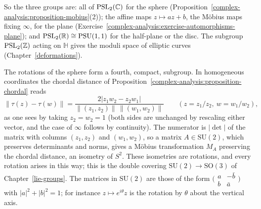 So the three groups are: all of $\mathrm{PSL}_2(\mathbb{C})$ for the sphere (Proposition~\ref{complex-analysis:proposition-mobius}(2)); the affine maps $z \mapsto az + b$, the M\"obius maps fixing $\infty$, for the plane
(Exercise~\ref{complex-analysis:exercise-automorphisms-plane}); and $\mathrm{PSL}_2(\mathbb{R}) \cong \mathrm{PSU}(1, 1)$ for the half-plane or the disc. The subgroup $\mathrm{PSL}_2(\mathbb{Z})$ acting on $\mathbb{H}$ gives the moduli
space of elliptic curves (Chapter~\ref{deformations}).

The rotations of the sphere form a fourth, compact, subgroup. In homogeneous coordinates the chordal distance of Proposition~\ref{complex-analysis:proposition-chordal} reads
\[
\|\tau(z) - \tau(w)\| = \frac{2|z_1w_2 - z_2w_1|}{\|(z_1, z_2)\|\,\|(w_1, w_2)\|} \qquad (z = z_1/z_2, \ w = w_1/w_2),
\]
as one sees by taking $z_2 = w_2 = 1$ (both sides are unchanged by rescaling either vector, and the case of $\infty$ follows by continuity). The numerator is $|\det|$ of the matrix with columns $(z_1, z_2)$ and
$(w_1, w_2)$, so a matrix $A \in \mathrm{SU}(2)$, which preserves determinants and norms, gives a M\"obius transformation $M_A$ preserving the chordal distance, an isometry of $S^2$. These isometries are rotations, and
every rotation arises in this way; this is the double covering $\mathrm{SU}(2) \to \mathrm{SO}(3)$ of Chapter~\ref{lie-groups}. The matrices in $\mathrm{SU}(2)$ are those of the form
$\bigl(\begin{smallmatrix}a & -\bar b\\ b & \bar a\end{smallmatrix}\bigr)$ with $|a|^2 + |b|^2 = 1$; for instance $z \mapsto e^{i\theta}z$ is the rotation by $\theta$ about the vertical axis.

